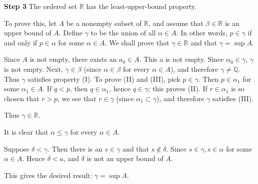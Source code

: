 
\textbf{Step 3}
The ordered set $\mathbb{R}$ has the least-upper-bound property.

To prove this, let $A$ be a nonempty subset of $\mathbb{R}$, and assume that $\beta \in \mathbb{R}$ is an upper bound of $A$. Define $\gamma$ to be the union of all $\alpha \in A$. In other words, $p\in \gamma$ if and only if $p \in \alpha$ for some $\alpha \in A$. We shall prove that $\gamma \in \mathbb{R}$ and that $\gamma = \sup A$.

Since $A$ is not empty, there exists an $a_0 \in A$. This a is not empty. Since $\alpha_0 \in \gamma$, $\gamma$ is not empty. Next, $\gamma \in \beta$ (since $\alpha \in \beta$ for every $\alpha \in A$), and therefore $\gamma \neq \mathbb{Q}$. Thus $\gamma$ satisfies property (I). To prove (II) and (III), pick $p \in \gamma$. Then $p \in \alpha_1$ for some $\alpha_1 \in A$. If $q <p$, then $q \in \alpha_1$, hence $q \in \gamma$; this proves (II). If $r \in \alpha_1$ is so chosen that $r > p$, we see that $r\in \gamma$ (since $\alpha_1 \subset \gamma$), and therefore $\gamma$
satisfies (III).

Thus $\gamma \in \mathbb{R}$.

It is clear that $\alpha \leq \gamma$ for every $\alpha \in A$.

Suppose $\delta < \gamma$. Then there is an $s \in \gamma$ and that $s \not\in \delta$. Since $s \in \gamma, s \in \alpha$
for some $\alpha \in A$. Hence $\delta <a$, and $\delta$ is not an upper bound of $A$.

This gives the desired result: $\gamma = \sup A$.

